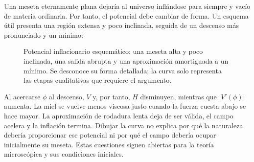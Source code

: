 Una meseta eternamente plana dejaría al universo inflándose para siempre y vacío de materia ordinaria. Por tanto, el potencial debe cambiar de forma. Un esquema útil presenta una región extensa y poco inclinada, seguida de un descenso más pronunciado y un mínimo:
\begin{figure}[htbp]
\centering
\begin{coursefitfigure}
\end{coursefitfigure}
\caption{Potencial inflacionario esquemático: una meseta alta y poco inclinada, una salida abrupta y una aproximación amortiguada a un mínimo. Se desconoce su forma detallada; la curva solo representa las etapas cualitativas que requiere el argumento.}
\label{fig:c09-inflation-potential}
\end{figure}

Al acercarse \(\phi\) al descenso, \(V\) y, por tanto, \(H\) disminuyen, mientras que \(\lvert V'(\phi)\rvert\) aumenta. La miel se vuelve menos viscosa justo cuando la fuerza cuesta abajo se hace mayor. La aproximación de rodadura lenta deja de ser válida, el campo acelera y la inflación termina. Dibujar la curva no explica por qué la naturaleza debería proporcionar ese potencial ni por qué el campo debería ocupar inicialmente su meseta. Estas cuestiones siguen abiertas para la teoría microscópica y sus condiciones iniciales.

\begin{classroomqa}
\end{classroomqa}

